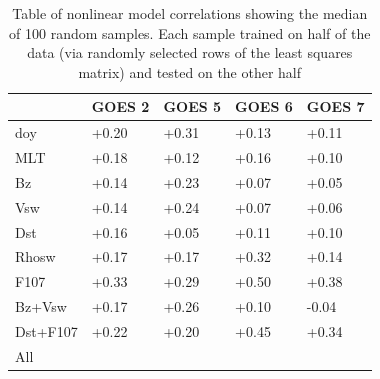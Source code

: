 \begin{table}[h]
	\small
	\begin{tabular}{|l|llll|}
		\hline
		& GOES 2 & GOES 5 & GOES 6 & GOES 7\\ \hline
		doy & +0.20 & +0.31 & +0.13 & +0.11 \\
		MLT & +0.18 & +0.12 & +0.16 & +0.10 \\
		Bz & +0.14 & +0.23 & +0.07 & +0.05 \\
		Vsw & +0.14 & +0.24 & +0.07 & +0.06 \\
		Dst & +0.16 & +0.05 & +0.11 & +0.10 \\
		Rhosw & +0.17 & +0.17 & +0.32 & +0.14 \\
		F107 & +0.33 & +0.29 & +0.50 & +0.38 \\
		Bz+Vsw & +0.17 & +0.26 & +0.10 & -0.04 \\
		Dst+F107 & +0.22 & +0.20 & +0.45 & +0.34 \\
		All &  &  &  &  \\
		\hline
	\end{tabular}
	\caption{Table of nonlinear model correlations showing the median of 100 random samples. Each sample trained on half of the data (via randomly selected rows of the least squares matrix) and tested on the other half} 
	\label{NNperltable}
\end{table}
